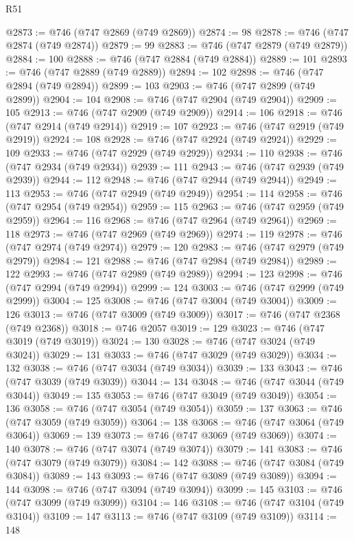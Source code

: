 \begin{lexlean}{R51}
\begin{coremodule}
@2873 := @746 (@747 @2869 (@749 @2869))
@2874 := 98
@2878 := @746 (@747 @2874 (@749 @2874))
@2879 := 99
@2883 := @746 (@747 @2879 (@749 @2879))
@2884 := 100
@2888 := @746 (@747 @2884 (@749 @2884))
@2889 := 101
@2893 := @746 (@747 @2889 (@749 @2889))
@2894 := 102
@2898 := @746 (@747 @2894 (@749 @2894))
@2899 := 103
@2903 := @746 (@747 @2899 (@749 @2899))
@2904 := 104
@2908 := @746 (@747 @2904 (@749 @2904))
@2909 := 105
@2913 := @746 (@747 @2909 (@749 @2909))
@2914 := 106
@2918 := @746 (@747 @2914 (@749 @2914))
@2919 := 107
@2923 := @746 (@747 @2919 (@749 @2919))
@2924 := 108
@2928 := @746 (@747 @2924 (@749 @2924))
@2929 := 109
@2933 := @746 (@747 @2929 (@749 @2929))
@2934 := 110
@2938 := @746 (@747 @2934 (@749 @2934))
@2939 := 111
@2943 := @746 (@747 @2939 (@749 @2939))
@2944 := 112
@2948 := @746 (@747 @2944 (@749 @2944))
@2949 := 113
@2953 := @746 (@747 @2949 (@749 @2949))
@2954 := 114
@2958 := @746 (@747 @2954 (@749 @2954))
@2959 := 115
@2963 := @746 (@747 @2959 (@749 @2959))
@2964 := 116
@2968 := @746 (@747 @2964 (@749 @2964))
@2969 := 118
@2973 := @746 (@747 @2969 (@749 @2969))
@2974 := 119
@2978 := @746 (@747 @2974 (@749 @2974))
@2979 := 120
@2983 := @746 (@747 @2979 (@749 @2979))
@2984 := 121
@2988 := @746 (@747 @2984 (@749 @2984))
@2989 := 122
@2993 := @746 (@747 @2989 (@749 @2989))
@2994 := 123
@2998 := @746 (@747 @2994 (@749 @2994))
@2999 := 124
@3003 := @746 (@747 @2999 (@749 @2999))
@3004 := 125
@3008 := @746 (@747 @3004 (@749 @3004))
@3009 := 126
@3013 := @746 (@747 @3009 (@749 @3009))
@3017 := @746 (@747 @2368 (@749 @2368))
@3018 := @746 @2057
@3019 := 129
@3023 := @746 (@747 @3019 (@749 @3019))
@3024 := 130
@3028 := @746 (@747 @3024 (@749 @3024))
@3029 := 131
@3033 := @746 (@747 @3029 (@749 @3029))
@3034 := 132
@3038 := @746 (@747 @3034 (@749 @3034))
@3039 := 133
@3043 := @746 (@747 @3039 (@749 @3039))
@3044 := 134
@3048 := @746 (@747 @3044 (@749 @3044))
@3049 := 135
@3053 := @746 (@747 @3049 (@749 @3049))
@3054 := 136
@3058 := @746 (@747 @3054 (@749 @3054))
@3059 := 137
@3063 := @746 (@747 @3059 (@749 @3059))
@3064 := 138
@3068 := @746 (@747 @3064 (@749 @3064))
@3069 := 139
@3073 := @746 (@747 @3069 (@749 @3069))
@3074 := 140
@3078 := @746 (@747 @3074 (@749 @3074))
@3079 := 141
@3083 := @746 (@747 @3079 (@749 @3079))
@3084 := 142
@3088 := @746 (@747 @3084 (@749 @3084))
@3089 := 143
@3093 := @746 (@747 @3089 (@749 @3089))
@3094 := 144
@3098 := @746 (@747 @3094 (@749 @3094))
@3099 := 145
@3103 := @746 (@747 @3099 (@749 @3099))
@3104 := 146
@3108 := @746 (@747 @3104 (@749 @3104))
@3109 := 147
@3113 := @746 (@747 @3109 (@749 @3109))
@3114 := 148

\end{coremodule}
\end{lexlean}
